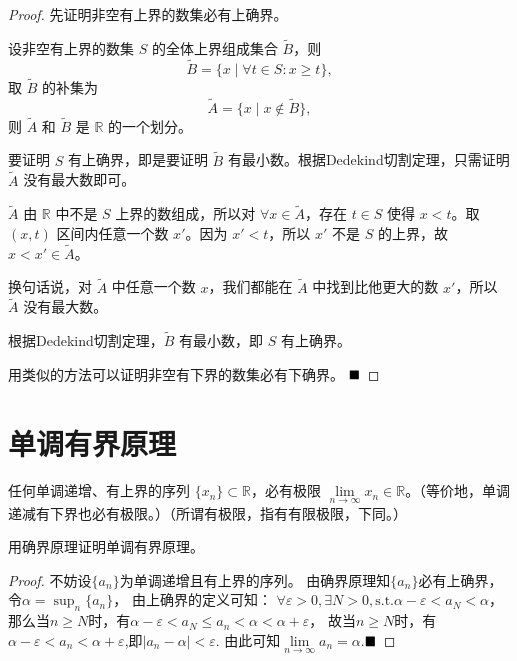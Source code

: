 \begin{proof}
    先证明非空有上界的数集必有上确界。

    设非空有上界的数集 \( S \) 的全体上界组成集合 \( \tilde{B} \)，则 
    \[ \tilde{B} = \{x \mid \forall t \in S : x \geq t\}, \]
    取 \( \tilde{B} \) 的补集为 
    \[ \tilde{A} = \{x \mid x \notin \tilde{B}\}, \]
    则 \( \tilde{A} \) 和 \(\tilde{B} \) 是 \( \mathbb{R} \) 的一个划分。
    
    要证明 \( S \) 有上确界，即是要证明 \( \tilde{B}\) 有最小数。根据Dedekind切割定理，只需证明 \( \tilde{A} \) 没有最大数即可。
    
    \( \tilde{A} \) 由 \( \mathbb{R} \) 中不是 \( S \) 上界的数组成，所以对 \( \forall x \in \tilde{A} \)，存在 \( t \in S \) 使得 \( x < t \)。取 \( (x, t) \) 区间内任意一个数 \( x' \)。因为 \( x' < t \)，所以 \( x' \) 不是 \( S \) 的上界，故 \( x < x' \in \tilde{A} \)。
    
    换句话说，对 \( \tilde{A} \) 中任意一个数 \( x \)，我们都能在 \( \tilde{A} \) 中找到比他更大的数 \( x' \)，所以 \( \tilde{A} \) 没有最大数。
    
    根据Dedekind切割定理，\( \tilde{B} \) 有最小数，即 \( S \) 有上确界。
    
    用类似的方法可以证明非空有下界的数集必有下确界。 $\hfill\blacksquare$
\end{proof}
    

    
    
    
    
\newpage
\section{单调有界原理}

\begin{theorem*}[单调有界原理]
    任何单调递增、有上界的序列 \(\{x_n\} \subset \mathbb{R}\)，必有极限 \(\lim \limits_{n \to \infty} x_n \in \mathbb{R}\)。（等价地，单调递减有下界也必有极限。）（所谓有极限，指有有限极限，下同。）
\end{theorem*}

\begin{problem}
    用确界原理证明单调有界原理。    
\end{problem}

\begin{proof}
  不妨设$\{a_n\}$为单调递增且有上界的序列。
  由确界原理知$\{a_n\}$必有上确界，令$\alpha = \sup_n \{a_n\} $，
  由上确界的定义可知：
  $\forall \varepsilon >0 ,\exists N> 0,\text{s.t.}\alpha - \varepsilon <a_N<\alpha$，
  那么当$n \geqslant N$时，有$\alpha -\varepsilon <a_N \leqslant a_n<\alpha <\alpha +\varepsilon$，
  故当$n\geqslant N$时，有$\alpha -\varepsilon <a_n<\alpha +\varepsilon $,即$|a_n - \alpha| < \varepsilon$.
  由此可知$\lim\limits_{n \to \infty} a_n = \alpha$.$\hfill\blacksquare$
\end{proof}

